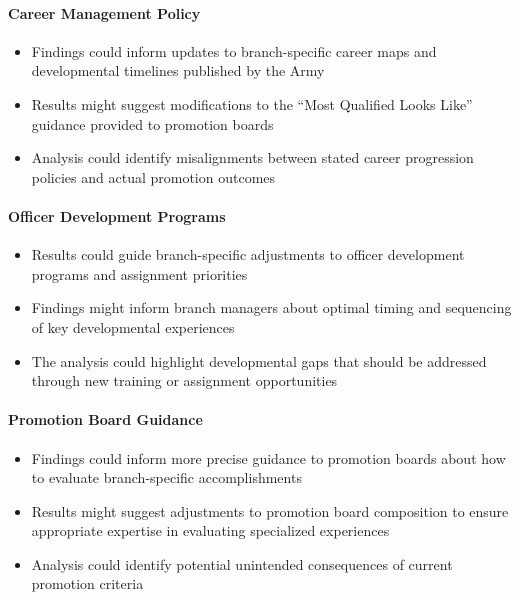 \documentclass[../main.tex]{subfiles}
\begin{document}

\paragraph{Career Management Policy}
\begin{itemize}
\item Findings could inform updates to branch-specific career maps and developmental timelines published by the Army
\item Results might suggest modifications to the ``Most Qualified Looks Like'' guidance provided to promotion boards \citep{army_cmf12}
\item Analysis could identify misalignments between stated career progression policies and actual promotion outcomes
\end{itemize}

\paragraph{Officer Development Programs}
\begin{itemize}
\item Results could guide branch-specific adjustments to officer development programs and assignment priorities
\item Findings might inform branch managers about optimal timing and sequencing of key developmental experiences
\item The analysis could highlight developmental gaps that should be addressed through new training or assignment opportunities
\end{itemize}

\paragraph{Promotion Board Guidance}
\begin{itemize}
\item Findings could inform more precise guidance to promotion boards about how to evaluate branch-specific accomplishments
\item Results might suggest adjustments to promotion board composition to ensure appropriate expertise in evaluating specialized experiences
\item Analysis could identify potential unintended consequences of current promotion criteria
\end{itemize}
\end{document}
